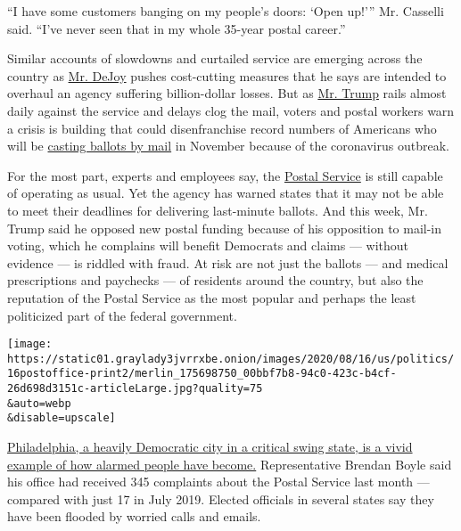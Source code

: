``I have some customers banging on my people's doors: `Open up!''' Mr.
Casselli said. ``I've never seen that in my whole 35-year postal
career.''

Similar accounts of slowdowns and curtailed service are emerging across
the country as
\href{https://www.nytimes3xbfgragh.onion/2020/08/18/us/politics/postal-service-suspends-changes.html}{Mr.
DeJoy} pushes cost-cutting measures that he says are intended to
overhaul an agency suffering billion-dollar losses. But as
\href{https://www.nytimes3xbfgragh.onion/2020/08/18/us/politics/postal-service-suspends-changes.html}{Mr.
Trump} rails almost daily against the service and delays clog the mail,
voters and postal workers warn a crisis is building that could
disenfranchise record numbers of Americans who will be
\href{https://www.nytimes3xbfgragh.onion/interactive/2020/08/11/us/politics/vote-by-mail-us-states.html}{casting
ballots by mail} in November because of the coronavirus outbreak.

For the most part, experts and employees say, the
\href{https://www.nytimes3xbfgragh.onion/2020/08/18/us/politics/postal-service-suspends-changes.html}{Postal
Service} is still capable of operating as usual. Yet the agency has
warned states that it may not be able to meet their deadlines for
delivering last-minute ballots. And this week, Mr. Trump said he opposed
new postal funding because of his opposition to mail-in voting, which he
complains will benefit Democrats and claims --- without evidence --- is
riddled with fraud. At risk are not just the ballots --- and medical
prescriptions and paychecks --- of residents around the country, but
also the reputation of the Postal Service as the most popular and
perhaps the least politicized part of the federal government.

\texttt{[image: https://static01.graylady3jvrrxbe.onion/images/2020/08/16/us/politics/16postoffice-print2/merlin\_175698750\_00bbf7b8-94c0-423c-b4cf-26d698d3151c-articleLarge.jpg?quality=75\\\&auto=webp\\\&disable=upscale]}

\href{https://www.inquirer.com/news/philadelphia/usps-tracking-in-transit-late-mail-delivery-philadelphia-packages-postal-service-20200802.html}{Philadelphia,
a heavily Democratic city in a critical swing state, is a vivid example
of how alarmed people have become.} Representative Brendan Boyle said
his office had received 345 complaints about the Postal Service last
month --- compared with just 17 in July 2019. Elected officials in
several states say they have been flooded by worried calls and emails.

